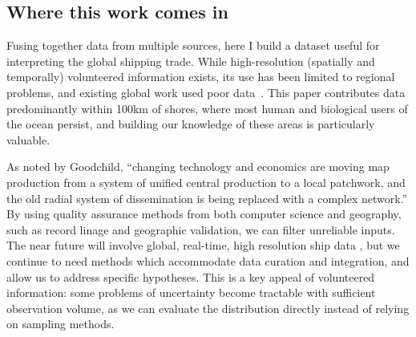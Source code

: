 \subsection{Where this work comes in}

Fusing together data from multiple sources, here I build a dataset useful for interpreting the global shipping trade. While high-resolution (spatially and temporally) volunteered information exists, its use has been limited to regional problems, and existing global work used poor data~\citep{Corbett2007, Halpern2008}. This paper contributes data predominantly within 100km of shores, where most human and biological users of the ocean persist, and building our knowledge of these areas is particularly valuable.

As noted by Goodchild, ``changing technology and economics are moving map production from a system of unified central production to a local patchwork, and the old radial system of dissemination is being replaced with a complex network.''\citep{goodchild1999cartographic} By using quality assurance methods from both computer science and geography, such as record linage and geographic validation, we can filter unreliable inputs. The near future will involve global, real-time, high resolution ship data \citep{JonesGoogle2012,carson2012satellite}, but we continue to need methods which accommodate data curation and integration, and allow us to address specific hypotheses. This is a key appeal of volunteered information: some problems of uncertainty become tractable with sufficient observation volume, as we can evaluate the distribution directly instead of relying on sampling methods.


